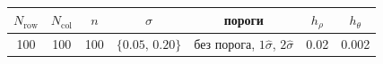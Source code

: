 \begin{tabular}{|c|c|c|c|c|c|c|}
\hline
$N_{\text{row}}$ & $N_{\text{col}}$ & $n$ & $\sigma$ & пороги & $h_\rho$ & $h_\theta$ \\
\hline
100 & 100 & 100 & $\{0.05,\,0.20\}$ & без порога, $1\hat\sigma$, $2\hat\sigma$ & 0.02 & 0.002 \\
\hline
\end{tabular}
